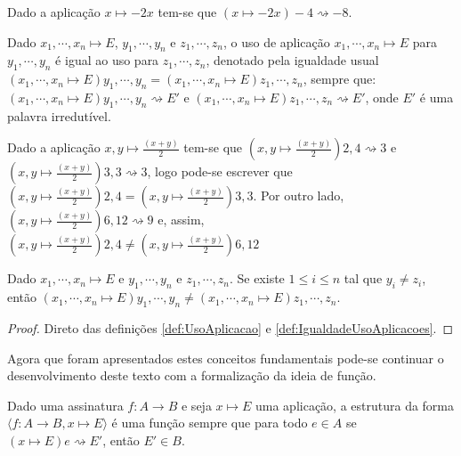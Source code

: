 \begin{example}
	Dado a aplicação $x \mapsto -2x$ tem-se que $(x \mapsto -2x)-4 \rightsquigarrow -8$.
\end{example}

\begin{definition}\label{def:IgualdadeUsoAplicacoes}
	Dado $x_1, \cdots, x_n \mapsto E$, $y_1, \cdots, y_n$ e $z_1, \cdots, z_n$, o uso de aplicação  $x_1, \cdots, x_n \mapsto E$ para $y_1, \cdots, y_n$ é igual ao uso para $z_1, \cdots, z_n$, denotado pela igualdade usual $(x_1, \cdots, x_n \mapsto E)y_1, \cdots, y_n = (x_1, \cdots, x_n \mapsto E)z_1, \cdots, z_n$, sempre que: $(x_1, \cdots, x_n \mapsto E)y_1, \cdots, y_n \rightsquigarrow E'$ e  $(x_1, \cdots, x_n \mapsto E)z_1, \cdots, z_n \rightsquigarrow E'$, onde $E'$ é uma palavra irredutível.
\end{definition}

\begin{example}
	Dado a aplicação $x, y \mapsto \frac{(x+y)}{2}$ tem-se que $(x, y \mapsto \frac{(x+y)}{2})2, 4 \rightsquigarrow 3$ e  $(x, y \mapsto \frac{(x+y)}{2})3, 3 \rightsquigarrow 3$, logo pode-se escrever que $(x, y \mapsto \frac{(x+y)}{2})2, 4 = (x, y \mapsto \frac{(x+y)}{2})3, 3$. Por outro lado, $(x, y \mapsto \frac{(x+y)}{2})6, 12 \rightsquigarrow 9$ e, assim, $(x, y \mapsto \frac{(x+y)}{2})2, 4 \neq (x, y \mapsto \frac{(x+y)}{2})6, 12$
\end{example}

\begin{proposition}
	Dado $x_1, \cdots, x_n \mapsto E$ e $y_1, \cdots, y_n$ e $z_1, \cdots, z_n$. Se existe $1 \leq i \leq n$ tal que $y_i \neq z_i$, então $(x_1, \cdots, x_n \mapsto E)y_1, \cdots, y_n \neq (x_1, \cdots, x_n \mapsto E)z_1, \cdots, z_n$.
\end{proposition}

\begin{proof}
	Direto das definições \ref{def:UsoAplicacao} e \ref{def:IgualdadeUsoAplicacoes}.
\end{proof}


Agora que foram apresentados estes conceitos fundamentais pode-se continuar o desenvolvimento deste texto com a formalização da ideia de função.

\begin{definition}[Função]
	Dado uma assinatura $f: A \rightarrow B$ e seja $x \mapsto E$ uma aplicação, a estrutura da forma $\langle f: A \rightarrow B, x \mapsto E \rangle$ é uma função sempre que para todo $e \in A$ se $(x \mapsto E)e \rightsquigarrow E'$, então $E' \in B$.
\end{definition}

